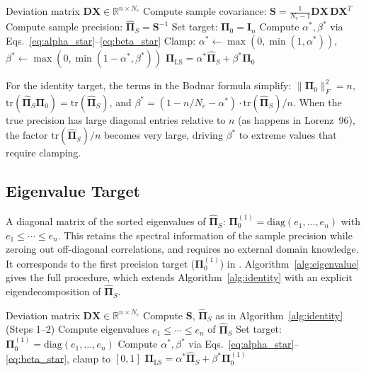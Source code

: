 \begin{algorithm}[t]
\caption{Direct Precision Shrinkage (Identity Target)}
\label{alg:identity}
\begin{algorithmic}[1]
\REQUIRE Deviation matrix $\mathbf{DX} \in \mathbb{R}^{n \times N_e}$
\STATE Compute sample covariance: $\mathbf{S} = \frac{1}{N_e-1} \mathbf{DX} \, \mathbf{DX}^T$
\STATE Compute sample precision: $\hat{\boldsymbol{\Pi}}_S = \mathbf{S}^{-1}$
\STATE Set target: $\boldsymbol{\Pi}_0 = \mathbf{I}_n$
\STATE Compute $\alpha^*, \beta^*$ via Eqs.~\eqref{eq:alpha_star}--\eqref{eq:beta_star}
\STATE Clamp: $\alpha^* \leftarrow \max(0, \min(1, \alpha^*))$, $\beta^* \leftarrow \max(0, \min(1 - \alpha^*, \beta^*))$
\RETURN $\boldsymbol{\Pi}_{\text{LS}} = \alpha^* \hat{\boldsymbol{\Pi}}_S + \beta^* \boldsymbol{\Pi}_0$
\end{algorithmic}
\end{algorithm}

For the identity target, the terms in the Bodnar formula simplify: $\|\boldsymbol{\Pi}_0\|_F^2 = n$, $\text{tr}(\hat{\boldsymbol{\Pi}}_S \boldsymbol{\Pi}_0) = \text{tr}(\hat{\boldsymbol{\Pi}}_S)$, and $\beta^* = (1 - n/N_e - \alpha^*) \cdot \text{tr}(\hat{\boldsymbol{\Pi}}_S) / n$. When the true precision has large diagonal entries relative to $n$ (as happens in Lorenz~96), the factor $\text{tr}(\hat{\boldsymbol{\Pi}}_S)/n$ becomes very large, driving $\beta^*$ to extreme values that require clamping.

\subsection{Eigenvalue Target}
\label{sec:eigenvalue_target}

A diagonal matrix of the sorted eigenvalues of $\hat{\boldsymbol{\Pi}}_S$: $\boldsymbol{\Pi}_0^{(1)} = \text{diag}(e_1, \ldots, e_n)$ with $e_1 \leq \cdots \leq e_n$. This retains the spectral information of the sample precision while zeroing out off-diagonal correlations, and requires no external domain knowledge. It corresponds to the first precision target ($\boldsymbol{\Pi}_0^{(1)}$) in \citep{looijmans2024comparison}. Algorithm~\ref{alg:eigenvalue} gives the full procedure, which extends Algorithm~\ref{alg:identity} with an explicit eigendecomposition of $\hat{\boldsymbol{\Pi}}_S$.

\begin{algorithm}[t]
\caption{Direct Precision Shrinkage (Eigenvalue Target)}
\label{alg:eigenvalue}
\begin{algorithmic}[1]
\REQUIRE Deviation matrix $\mathbf{DX} \in \mathbb{R}^{n \times N_e}$
\STATE Compute $\mathbf{S}$, $\hat{\boldsymbol{\Pi}}_S$ as in Algorithm~\ref{alg:identity} (Steps 1--2)
\STATE Compute eigenvalues $e_1 \leq \cdots \leq e_n$ of $\hat{\boldsymbol{\Pi}}_S$
\STATE Set target: $\boldsymbol{\Pi}_0^{(1)} = \text{diag}(e_1, \ldots, e_n)$
\STATE Compute $\alpha^*, \beta^*$ via Eqs.~\eqref{eq:alpha_star}--\eqref{eq:beta_star}, clamp to $[0,1]$
\RETURN $\boldsymbol{\Pi}_{\text{LS}} = \alpha^* \hat{\boldsymbol{\Pi}}_S + \beta^* \boldsymbol{\Pi}_0^{(1)}$
\end{algorithmic}
\end{algorithm}

